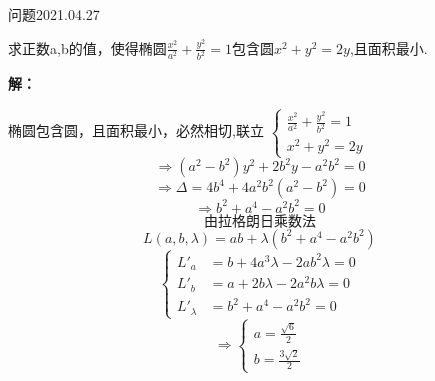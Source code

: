 \begin{mybox}{问题2021.04.27}
	
	\qquad 求正数a,b的值，使得椭圆$\frac{x^2}{a^2}+\frac{y^2}{b^2}=1$包含圆$x^2+y^2=2y$,且面积最小.
\end{mybox}
\noindent
\textbf{解：}

椭圆包含圆，且面积最小，必然相切,联立 $\begin{cases}
	
	\frac{x^2}{a^2}+\frac{y^2}{b^2}=1\\
	x^2+y^2=2y
	
\end{cases}$\\
$$\Rightarrow (a^2-b^2)y^2+2b^2 y-a^2b^2=0$$
$$\Rightarrow \Delta =4b^4+4a^2b^2(a^2-b^2)=0$$
$$\Rightarrow b^2+a^4-a^2b^2=0$$
$$\text{由拉格朗日乘数法}$$
$$L(a,b,\lambda)= ab+ \lambda(b^2+a^4-a^2b^2) $$
\begin{equation*}
	\left\{
	\begin{aligned}
		L'_{a}&=b+4a^3\lambda -2ab^2\lambda=0\\
		L'_{b}&=a+2b\lambda-2a^2b\lambda=0\\
		L'_{\lambda}&=b^2+a^4-a^2b^2=0
	\end{aligned}
	\right.
\end{equation*}
$$\Rightarrow \begin{cases}
	a=\frac{\sqrt{6}}{2}\\
	b=\frac{3\sqrt{2}}{2}
\end{cases} $$